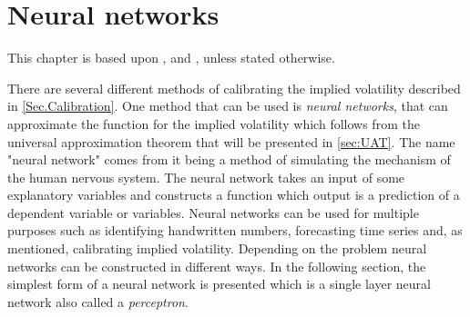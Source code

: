 \chapter{Neural networks}\label{Ch.3}
This chapter is based upon \citep[Ch. 10]{SL-ISLR}, \citep[Ch. 1]{NN} and \citep[Ch. 2]{NNDL}, unless stated otherwise.


There are several different methods of calibrating the implied volatility described in \autoref{Sec.Calibration}. One method that can be used is \emph{neural networks}, that can approximate the function for the implied volatility which follows from the universal approximation theorem that will be presented in \autoref{sec:UAT}. The name "neural network" comes from it being a method of simulating the mechanism of the human nervous system. The neural network takes an input of some explanatory variables and constructs a function which output is a prediction of a dependent variable or variables. Neural networks can be used for multiple purposes such as identifying handwritten numbers, forecasting time series and, as mentioned, calibrating implied volatility. Depending on the problem neural networks can be constructed in different ways. In the following section, the simplest form of a neural network is presented which is a single layer neural network also called a \emph{perceptron}.


